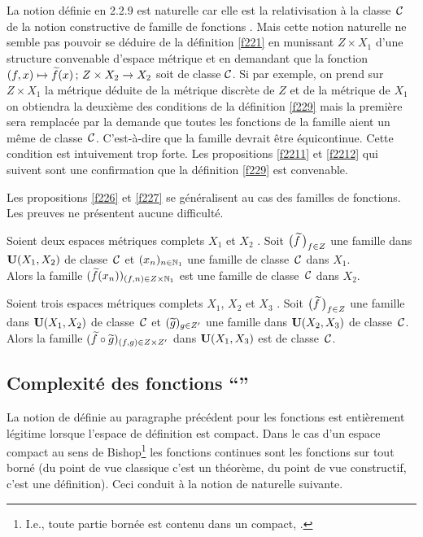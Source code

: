 \begin{fremark} \label{f2210}
La notion définie en 2.2.9 est naturelle car elle est la relativisation à la classe~${{\cal C}}$ de la notion constructive de famille de fonctions \unicos. 
Mais cette notion naturelle ne semble pas pouvoir se déduire de la 
définition \ref{f221} en munissant   $Z \times  X_1$  d'une structure 
convenable d'espace métrique \rapr et en demandant que la fonction   $(f,x) \mapsto \widetilde{f}(x) \,;\, Z \times X_2 \rightarrow X_2$   soit \uni de classe  
${{\cal C}}$. Si par exemple, on prend sur   $Z \times  X_1$  la métrique déduite 
de la métrique discrète de  $Z$  et de la métrique de  $X_1$  on obtiendra 
la deuxième des conditions de la définition  \ref{f229}  mais la première 
sera remplacée par la demande que toutes les fonctions de la famille aient un 
même \mcu de classe~${{\cal C}}$. C'est-à-dire que la famille devrait être \uni 
équicontinue. Cette condition est intuivement trop forte. Les propositions 
\ref{f2211} et \ref{f2212} qui suivent sont une confirmation que la définition 
\ref{f229} est convenable.
\end{fremark}
Les propositions \ref{f226}  et \ref{f227} se généralisent au cas des familles 
de fonctions. Les preuves ne présentent aucune difficulté.
\begin{fproposition} \label{f2211}
Soient  deux espaces métriques complets  $X_1$  et  $X_2$  
\raprs.  Soit   $\big(\widetilde{f}\,\big)_{f \in Z}$  une famille dans   ${\bf U}(X_1,X_2)$  
\uni de classe~${{\cal C}}$    et  $(x_n)_{n \in \mathbb {N}_1}$  une famille de classe~${{\cal C}}$   
dans  $X_1$.\\  
Alors la famille  $(\widetilde{f}(x_n))_{(f,n) \in Z \times \mathbb {N}_1}$  est une 
famille de classe~${{\cal C}}$   dans  $X_2$.
\end{fproposition}

\begin{fproposition} \label{f2212}
Soient  trois espaces métriques complets  $X_1$, $X_2$  et  $X_3$  \raprs.  
Soit   $\big(\widetilde{f}\,\big)_{f \in Z}$ une famille dans  ${\bf U}(X_1,X_2)$  \uni de 
classe~${{\cal C}}$    et    $(\widetilde{g})_{g \in Z'}$  une famille dans  
${\bf U}(X_2,X_3)$  \uni de classe~${{\cal C}}$. \\ 
Alors la famille  
$(\widetilde{f} \circ \widetilde{g})_{(f,g) \in Z \times Z'}$  
dans  ${\bf U}(X_1,X_3)$  est \uni de classe~${{\cal C}}$.
\end{fproposition}

\subsection{Complexité des fonctions ``\loca \unicos''} \label{fsubsec23}
La notion de \com définie au paragraphe précédent pour les fonctions 
\unicos est entièrement légitime lorsque l'espace de définition est 
compact. Dans le cas d'un espace \loca compact au sens de Bishop{\footnote{I.e., toute partie bornée est contenu dans un compact, \cite{fBB}.}} les fonctions continues sont les fonctions \unicos sur tout borné (du point de vue classique c'est un théorème, du point de vue constructif, c'est une définition). Ceci conduit à la notion de \com naturelle suivante.

